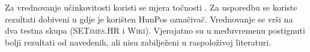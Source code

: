 Za vrednovanje učinkovitosti koristi se mjera točnosti . Za
usporedbu se koriste rezultati dobiveni u \citep{agic2013lemmatization} gdje je
korišten HunPos označivač. Vrednovanje se vrši na dva testna skupa
(\textsc{SETimes.HR} i \textsc{Wiki}). Vjerojatno su u međuvremenu postignuti
bolji rezultati od navedenih, ali nisu zabilježeni u raspoloživoj literaturi.
